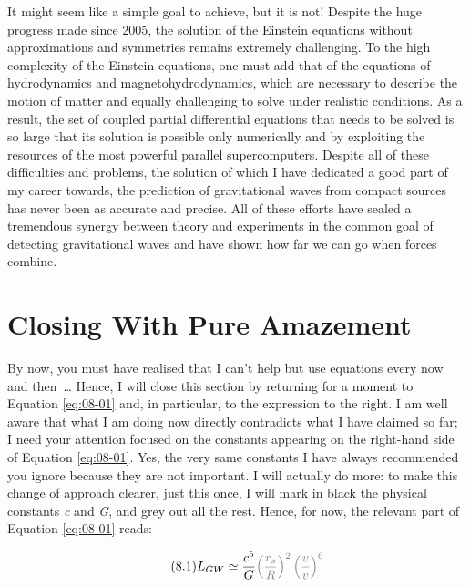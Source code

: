 It might seem like a simple goal to achieve, but it is not! Despite the huge progress
made since 2005, the solution of the Einstein equations without approximations and
symmetries remains extremely challenging. To the high complexity of the Einstein
equations, one must add that of the equations of hydrodynamics and magnetohydrodynamics,
which are necessary to describe the motion of matter and equally challenging to solve
under realistic conditions. As a result, the set of coupled partial
differential equations that needs to be solved is so large that its
solution is possible only numerically and by exploiting the resources of the most
powerful parallel supercomputers. Despite all of these difficulties
and problems, the solution of which I have dedicated a good part of my career towards,
the prediction of gravitational waves from compact sources has never been as accurate
and precise. All of these efforts have sealed a tremendous synergy between theory and
experiments in the common goal of detecting gravitational waves and have shown how far
we can go when forces combine.

\section{Closing With Pure Amazement}\label{sec:08-luminosity}

By now, you must have realised that I can't help but use equations every now and
then~\ldots{} Hence, I will close this section by returning for a moment to Equation
\eqref{eq:08-01} and, in particular, to the expression to the right. I am well aware that what I am
doing now directly contradicts what I have claimed so far; I need your attention focused
on the constants appearing on the right-hand side of Equation \eqref{eq:08-01}. Yes, the very same
constants I have always recommended you ignore because they are not important. I will
actually do more: to make this change of approach clearer, just this once, I will mark
in black the physical constants \emph{c} and \emph{G}, and grey out all the rest. Hence,
for now, the relevant part of Equation \eqref{eq:08-01} reads:

\begingroup\renewcommand{\theHequation}{8.repeat}\begin{equation}\tag{8.1}\label{eq:08-01-repeat}
L_{GW} \simeq \frac{c^{5}}{G}\textcolor{gray}{\left( \frac{r_{s}}{R} \right)^{2}\left( \frac{v}{v} \right)^{6}\ }
\end{equation}\endgroup

